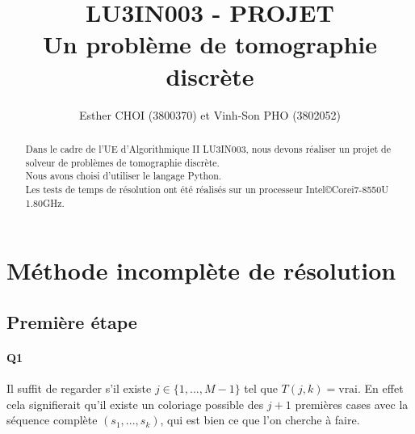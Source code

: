 \documentclass[12pt]{article}
\title{LU3IN003 - PROJET \\ Un problème de tomographie discrète\\}
\author{Esther CHOI (3800370) et Vinh-Son PHO (3802052)}
\newcommand{\true}{\text{vrai}}
\begin{document}
	\maketitle
	\tableofcontents
	
	
	\begin{abstract}
		Dans le cadre de l'UE d'Algorithmique II LU3IN003, nous devons réaliser un projet de solveur de problèmes de tomographie discrète. \\
		Nous avons choisi d'utiliser le langage Python. \\
		Les tests de temps de résolution ont été réalisés sur un processeur Intel\copyright Core\texttrademark i7-8550U 1.80GHz.
	\end{abstract}
	
	
	\newpage
	
	
	\section{Méthode incomplète de résolution}
	
		\subsection{Première étape}
		
			\paragraph{Q1}
				Il suffit de regarder s'il existe $ j \in \{1,...,M-1\} $ tel que $ T(j,k) = \true $. En effet cela signifierait qu'il existe un coloriage possible des $ j+1 $ premières cases avec la séquence complète $ (s_1,...,s_k) $, qui est bien ce que l'on cherche à faire.
		
\end{document}
